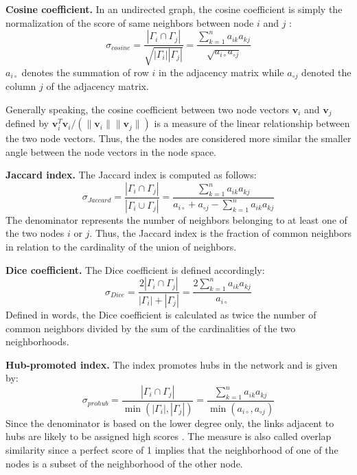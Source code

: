 \textbf{Cosine coefficient.} In an undirected graph, the cosine coefficient is simply the normalization of the score of same neighbors between node $i$ and $j$ \cite{fouss2016algorithms}:
\begin{equation}
    \label{cosine}
    \sigma_{cosine} = \frac{|\Gamma_i \cap \Gamma_j|}{\sqrt{|\Gamma_i||\Gamma_j|}} = \frac{\sum_{k=1}^n a_{ik}a_{kj}}{\sqrt{a_{i \circ }a_{\circ j}}}
\end{equation}
$a_{i \circ }$ denotes the summation of row $i$ in the adjacency matrix while $a_{\circ j}$ denoted the column $j$ of the adjacency matrix.

Generally speaking, the cosine coefficient between two node vectors $\textbf{v}_i$ and $\textbf{v}_j$ defined by $\textbf{v}_i^T\textbf{v}_i/(\|\textbf{v}_i\|\|\textbf{v}_j\|)$ is a measure of the linear relationship between the two node vectors. Thus, the the nodes are considered more similar the smaller angle between the node vectors in the node space.

\textbf{Jaccard index.} The Jaccard index is computed as follows:
\begin{equation}
    \label{jaccard}
    \sigma_{Jaccard} = \frac{|\Gamma_i \cap \Gamma_j|}{|\Gamma_i \cup \Gamma_j|} = \frac{\sum_{k=1}^n a_{ik}a_{kj}}{a_{i \circ }+a_{\circ j}-\sum_{k=1}^n a_{ik}a_{kj}}
\end{equation}
The denominator represents the number of neighbors belonging to at least one of the two nodes $i$ or $j$. Thus, the Jaccard index is the fraction of common neighbors in relation to the cardinality of the union of neighbors. 

\textbf{Dice coefficient.} The Dice coefficient is defined accordingly:
\begin{equation}
    \label{dice}
    \sigma_{Dice} = \frac{2 |\Gamma_i \cap \Gamma_j|}{|\Gamma_i|+|\Gamma_j|}= \frac{2\sum_{k=1}^n a_{ik}a_{kj}}{a_{i \circ }}
\end{equation}
Defined in words, the Dice coefficient is calculated as twice the number of common neighbors divided by the sum of the cardinalities of the two neighborhoods. 

\textbf{Hub-promoted index.} The index promotes hubs in the network and is given by: 
\begin{equation}
    \label{prohub}
    \sigma_{prohub} = \frac{|\Gamma_i \cap \Gamma_j|}{\min(|\Gamma_i|,|\Gamma_j|)} = \frac{\sum_{k=1}^n a_{ik}a_{kj}}{\min(a_{i \circ },a_{\circ j})}
\end{equation}
Since the denominator is based on the lower degree only, the links adjacent to hubs are likely to be assigned high scores \citep{lu2011}. The measure is also called overlap similarity \citep{fouss2016algorithms} since a perfect score of 1 implies that the neighborhood of one of the nodes is a subset of the neighborhood of the other node.

